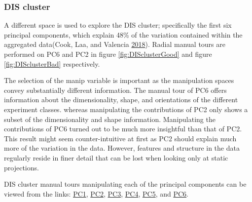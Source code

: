 \hypertarget{dis-cluster}{%
\subsubsection{DIS cluster}\label{dis-cluster}}

A different space is used to explore the DIS cluster; specifically the
first six principal components, which explain 48\% of the variation
contained within the aggregated data(Cook, Laa, and Valencia
\protect\hyperlink{ref-cook_dynamical_2018}{2018}). Radial manual tours
are performed on PC6 and PC2 in figure \ref{fig:DISclusterGood} and
figure \ref{fig:DISclusterBad} respectively.

The selection of the manip variable is important as the manipulation
spaces convey substantially different information. The manual tour of
PC6 offers information about the dimensionality, shape, and orientations
of the different experiment classes. whereas manipulating the
contributions of PC2 only shows a subset of the dimensionality and shape
information. Manipulating the contributions of PC6 turned out to be much
more insightful than that of PC2. This result might seem
counter-intuitive at first as PC2 should explain much more of the
variation in the data. However, features and structure in the data
regularly reside in finer detail that can be lost when looking only at
static projections.

DIS cluster manual tours manipulating each of the principal components
can be viewed from the links:
\href{https://nspyrison.netlify.com/thesis/discluster_manualtour_pc1/}{PC1},
\href{https://nspyrison.netlify.com/thesis/discluster_manualtour_pc2/}{PC2},
\href{https://nspyrison.netlify.com/thesis/discluster_manualtour_pc3/}{PC3},
\href{https://nspyrison.netlify.com/thesis/discluster_manualtour_pc4/}{PC4},
\href{https://nspyrison.netlify.com/thesis/discluster_manualtour_pc5/}{PC5},
and
\href{https://nspyrison.netlify.com/thesis/discluster_manualtour_pc6/}{PC6}.

